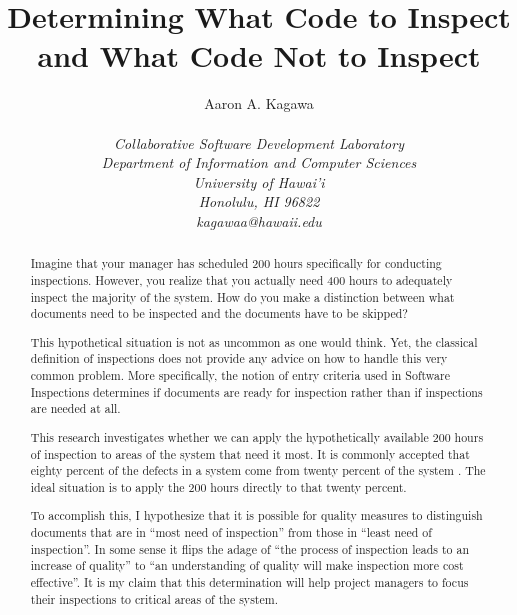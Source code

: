 \documentclass[11pt,twocolumn]{article}
\begin{document}
\title{Determining What Code to Inspect and What Code Not to Inspect}

\author{\protect\begin{tabular}{ccc}
Aaron A. Kagawa \\
\end{tabular}\\
\em  Collaborative Software Development Laboratory \\
\em  Department of Information and Computer Sciences \\
\em  University of Hawai'i \\
\em  Honolulu, HI 96822 \\
\em  kagawaa@hawaii.edu}
\maketitle
\thispagestyle{empty}

\begin{abstract}  %
Imagine that your manager has scheduled 200 hours specifically for
conducting inspections. However, you realize that you actually need 400
hours to adequately inspect the majority of the system.  How do you make
a distinction between what documents need to be inspected and the
documents have to be skipped?
  
This hypothetical situation is not as uncommon as one would think. Yet, the
classical definition of inspections does not provide any advice on how to
handle this very common problem. More specifically, the notion of entry
criteria used in Software Inspections determines if documents are ready for
inspection \cite{Ebenau94} rather than if inspections are needed at all.

This research investigates whether we can apply the hypothetically
available 200 hours of inspection to areas of the system that need it most.
It is commonly accepted that eighty percent of the defects in a system come
from twenty percent of the system \cite{Boehm01}. The ideal situation is to
apply the 200 hours directly to that twenty percent.

To accomplish this, I hypothesize that it is possible for quality measures
to distinguish documents that are in ``most need of inspection'' from those
in ``least need of inspection''. In some sense it flips the adage of ``the
process of inspection leads to an increase of quality'' to ``an
understanding of quality will make inspection more cost effective''. It is
my claim that this determination will help project managers to focus their
inspections to critical areas of the system.
\end{abstract}
\end{document}
